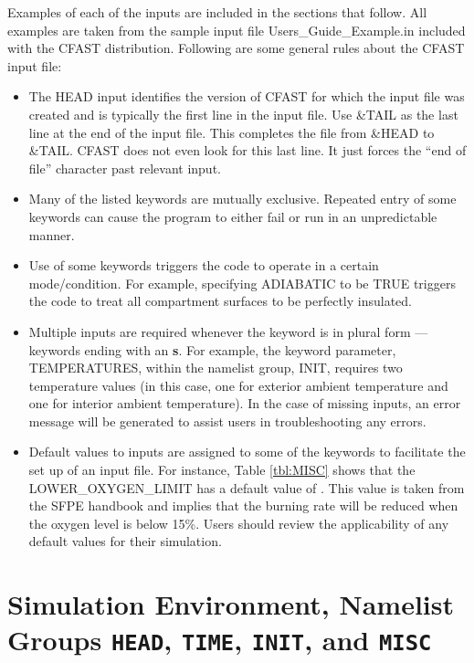 Examples of each of the inputs are included in the sections that follow.  All examples are taken from the sample input file {\ct Users\_Guide\_Example.in} included with the CFAST distribution. Following are some general rules about the CFAST input file:

\begin{itemize}
\item The {\ct HEAD} input identifies the version of CFAST for which the input file was created and is typically the first line in the input file. Use {\ct \&TAIL} as the last line at the end of the input file. This completes the file from {\ct \&HEAD} to {\ct \&TAIL}. CFAST does not even look for this last line. It just forces the “end of file” character past relevant input.
\item Many of the listed keywords are mutually exclusive. Repeated entry of some keywords can cause the program to either fail or run in an unpredictable manner.
\item Use of some keywords triggers the code to operate in a certain mode/condition. For example, specifying {\ct ADIABATIC} to be {\ct TRUE} triggers the code to treat all compartment surfaces to be perfectly insulated.
\item Multiple inputs are required whenever the keyword is in plural form --- keywords ending with an \textbf{s}. For example, the keyword parameter, {\ct TEMPERATURES}, within the namelist group, {\ct INIT}, requires two temperature values (in this case, one for exterior ambient temperature and one for interior ambient temperature). In the case of missing inputs, an error message will be generated to assist users in troubleshooting any errors.
\item Default values to inputs are assigned to some of the keywords to facilitate the set up of an input file. For instance, Table \ref{tbl:MISC} shows that the {\ct LOWER\_OXYGEN\_LIMIT} has a default value of {}. This value is taken from the SFPE handbook \cite{SFPE:2003} and implies that the burning rate will be reduced when the oxygen level is below 15\%. Users should review the applicability of any default values for their simulation.
\end{itemize}


\clearpage

\section{Simulation Environment, Namelist Groups \texorpdfstring{{\tt HEAD}}{HEAD}, \texorpdfstring{{\tt TIME}}{TIME}, \texorpdfstring{{\tt INIT}}{INIT}, and  \texorpdfstring{{\tt MISC}}{MISC}}

